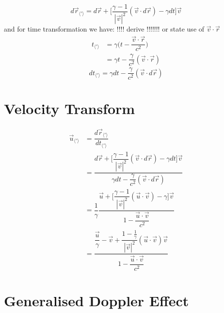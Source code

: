\begin{equation}%
    d\vec{r}_{\langle ' \rangle}  = d\vec{r} + \Big[ \dfrac{\gamma-1}{|\vec{v}|^2}(\vec{v}\cdot d\vec{r})- \gamma dt\Big]\vec{v}
\end{equation}%
and for time transformation we have: !!!! derive !!!!!!! or state use of $\vec{v}\cdot\vec{r}$
\begin{equation}%
    \begin{split}
    t_{\langle ' \rangle}  &= \gamma \bigg( t - \dfrac{\vec{v}\cdot\vec{r}}{c^2}\bigg) \\
    &= \gamma t - \dfrac{\gamma}{c^2}(\vec{v}\cdot\vec{r})
    \end{split}
\end{equation}%
\begin{equation}%
    dt_{\langle ' \rangle}  = \gamma dt - \dfrac{\gamma}{c^2}(\vec{v}\cdot d\vec{r})
\end{equation}%

\section{Velocity Transform}
\begin{equation}%
\label{Generalised velocity transform}
    \begin{split}
    \vec{u}_{\langle ' \rangle}  &= \dfrac{d\vec{r}_{\langle ' \rangle} }{dt_{\langle ' \rangle} }\\
    &= \dfrac{d\vec{r} + \Big[ \dfrac{\gamma-1}{|\vec{v}|^2}(\vec{v}\cdot d\vec{r})- \gamma dt\Big]\vec{v}}{\gamma dt - \dfrac{\gamma}{c^2}(\vec{v}\cdot d\vec{r})} \\
    &= \dfrac{1}{\gamma} \dfrac{\vec{u} + \Big[\dfrac{\gamma-1}{|\vec{v}|^2}(\vec{u}\cdot \vec{v})- \gamma \Big] \vec{v}}{1 - \dfrac{\vec{u}\cdot\vec{v}}{c^2}}\\
    &= \dfrac{\dfrac{\vec{u}}{\gamma} - \vec{v} + \dfrac{1-\frac{1}{\gamma}}{|\vec{v}|^2}(\vec{u}\cdot \vec{v})\vec{v} }{1 - \dfrac{\vec{u}\cdot\vec{v}}{c^2}}
    \end{split}
\end{equation}%

\section{Generalised Doppler Effect}

